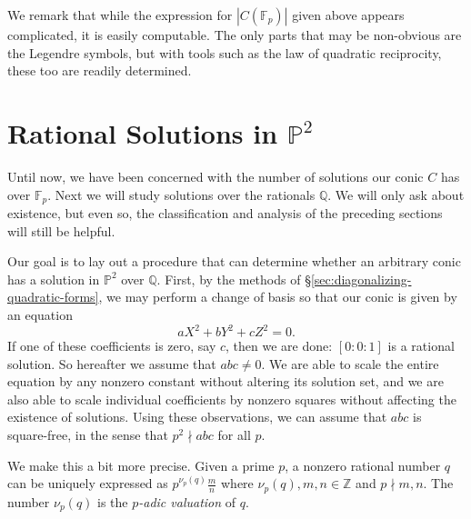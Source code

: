 \documentclass[10pt,a4paper]{amsart}
\numberwithin{equation}{section}
\numberwithin{figure}{section}
\numberwithin{table}{section}
\theoremstyle{definition}
\theoremstyle{plain}
\theoremstyle{remark}
\theoremstyle{plain}
\theoremstyle{definition}
\theoremstyle{plain}
\theoremstyle{plain}
\renewcommand{\P}{\mathbb{P}}
\newcommand{\F}{\mathbb{F}}
\newcommand{\Z}{\mathbb{Z}}
\newcommand{\Q}{\mathbb{Q}}
\newcommand{\ndiv}{\!\nmid\!}
\begin{document}
	\begin{comment}
	Consolidate with Example~4.4!
	\textcolor{red}{Note that if we are in case \eqref{case:0} of Proposition~\ref{prop:counting-P1-solutions}, i.e., if $a=b=c=0$, then $\gamma$ is a residue if and only if $-1$ is. Thus, by Theorem~\ref{thm:diag-P2}, we cannot be in cases \eqref{case:rank2_x^2+y^2=0} or \eqref{case:rank2_x^2+ry^2=0} of Proposition~\ref{prop:counting-P2-solutions} where the projectivized conic has only $1$ solution. Were this the case, Lemma~\ref{lem:relate-solutions-affine-proj} would imply that our affine conic has a negative number (to be exact, $-p$) of solutions!}
	\end{comment}
	
	We remark that while the expression for $|C(\F_p)|$ given above appears complicated, it is easily computable. The only parts that may be non-obvious are the Legendre symbols, but with tools such as the law of quadratic reciprocity, these too are readily determined.
	
	\section{Rational Solutions in $\P^2$}\label{sec:rational-soln}
	Until now, we have been concerned with the number of solutions our conic $C$ has over $\F_p$. Next we will study solutions over the rationals $\Q$. 
	We will only ask about existence, but even so, the classification and analysis of the preceding sections will still be helpful.
	
	Our goal is to lay out a procedure that can determine whether an arbitrary conic has a solution in $\P^2$ over $\Q$. First, by the methods of \S\ref{sec:diagonalizing-quadratic-forms}, we may perform a change of basis so that our conic is given by an equation
	\[
		aX^2 + bY^2 + cZ^2 = 0.
	\]
	If one of these coefficients is zero, say $c$, then we are done: $[0:0:1]$ is a rational solution. So hereafter we assume that $abc\neq 0$. We are able to scale the entire equation by any nonzero constant without altering its solution set, and we are also able to scale individual coefficients by nonzero squares without affecting the existence of solutions. Using these observations, we can assume that $abc$ is square-free, in the sense that $p^2\ndiv abc$ for all $p$.
	
	We make this a bit more precise. Given a prime $p$, a nonzero rational number $q$ can be uniquely expressed as $p^{\nu_p(q)}\frac{m}{n}$ where $\nu_p(q),m,n\in\Z$ and $p\ndiv m,n$. The number $\nu_p(q)$ is the \emph{$p$-adic valuation} of $q$.
	
\end{document}
